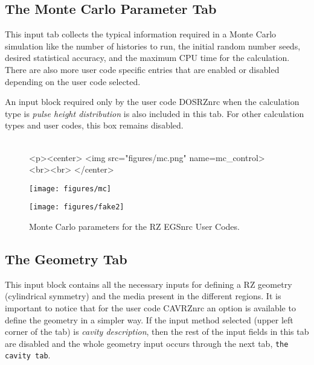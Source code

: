\documentclass[12pt,twoside]{article}   %
\begin{document}
\newpage
\subsection{The Monte Carlo Parameter Tab}
\label{mc}


This input tab collects the typical information required in a Monte Carlo simulation like
the number of histories to run, the initial random number seeds, desired statistical accuracy,
and the maximum CPU time for the calculation. There are also more user code specific entries
that are enabled or disabled depending on the user code selected.

An input block required only by the user code DOSRZnrc when the calculation type is
{\em pulse height distribution} is also included in this tab. For other calculation types and user codes,
this box remains disabled. \\ \\


\begin{figure}[htb]
\begin{htmlonly}
\begin{rawhtml}
<p><center>
<img src="figures/mc.png" name=mc_control><br><br>
</center>
\end{rawhtml}
\end{htmlonly}
\begin{latexonly}
\begin{center}
\texttt{[image: figures/mc]}
\end{center}
\end{latexonly}
\begin{center}
\texttt{[image: figures/fake2]}
\end{center}
\caption{Monte Carlo parameters for the RZ EGSnrc User Codes.}
\label{mc_control}
\end{figure}


\newpage
\subsection{The Geometry Tab}

This input block contains all the necessary inputs for defining a RZ geometry (cylindrical symmetry)
and the media present in the different regions. It is important to notice that for the user code
CAVRZnrc an option is available to define the geometry in a simpler way. If the input method selected
(upper left corner of the tab) is {\em cavity description}, then the rest of the input fields in this
tab are disabled and the whole geometry input occurs through the next tab, {\tt the cavity tab}.
\end{document}
